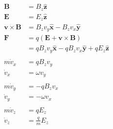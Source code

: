 \documentclass{article}
\renewcommand{\vec}[1]{\boldsymbol{\mathbf{#1}}}
\newcommand{\uvec}[1]{\hat{\vec{#1}}}
\begin{document}
\begin{align*}
  \vec{B}                       & = B_z \uvec{z}                                                                                                                                              \\
  \vec{E}                       & = E_z \uvec{z}                                                                                                                                              \\
  \vec{v} \times \vec{B}        & = B_z v_y \uvec{x} - B_z v_x \uvec{y}                                                                                                                       \\
  \vec{F}                       & = q (\vec{E} + \vec{v} \times \vec{B})                                                                                                                      \\
                                & = q B_z v_y \uvec{x} - q B_z v_x \uvec{y} + q E_z \uvec{z}                                                                                                  \\ \\
  m \dot{v}_x                   & = q B_z v_y                                                                                                                                                 \\
  \dot{v}_x                     & = \omega v_y                                                                                                                                                \\ \\
  m \dot{v}_y                   & = -q B_z v_x                                                                                                                                                \\
  \dot{v}_y                     & = -\omega v_x                                                                                                                                               \\ \\
  m \dot{v}_z                   & = q E_z                                                                                                                                                     \\
  \dot{v}_z                     & = \frac{q}{m} E_z                                                                                                                                           \\ \\

\end{align*}
\end{document}
